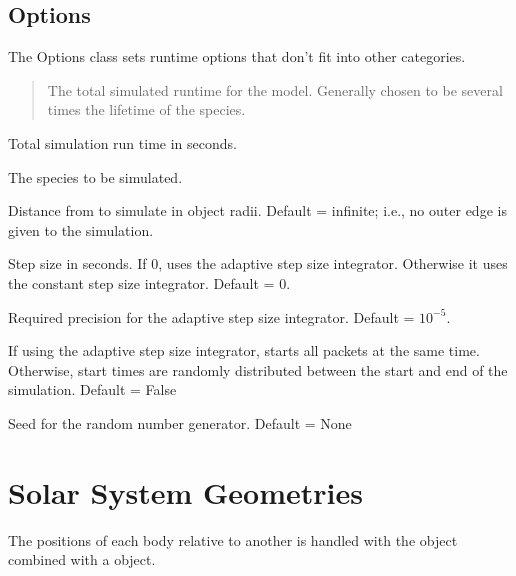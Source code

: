 \documentclass[letterpaper,10pt,english]{sphinxmanual}
\begin{document}
\subsection{Options}
\label{\detokenize{nexoclom2/inputfiles:options}}\label{\detokenize{nexoclom2/inputfiles:id8}}
\sphinxAtStartPar
The Options class sets runtime options that don’t fit into other categories.
\begin{quote}

\sphinxAtStartPar
The total simulated runtime for the model. Generally chosen to be several
times the lifetime of the species.
\end{quote}
\begin{description}
\sphinxAtStartPar
Total simulation run time in seconds.

\sphinxAtStartPar
The species to be simulated.

\sphinxAtStartPar
Distance from  to simulate in object radii. Default =
infinite; i.e., no outer edge is given to the simulation.

\sphinxAtStartPar
Step size in seconds. If 0, uses the adaptive step size integrator. Otherwise
it uses the constant step size integrator. Default = 0.

\sphinxAtStartPar
Required precision for the adaptive step size integrator.
Default = \(10^{-5}\).

\sphinxAtStartPar
If using the adaptive step size integrator, 
starts all packets at the same time. Otherwise, start times are
randomly distributed between the start and end of the simulation.
Default = False

\sphinxAtStartPar
Seed for the random number generator. Default = None

\end{description}

\sphinxstepscope


\section{Solar System Geometries}
\label{\detokenize{nexoclom2/planet_distance:solar-system-geometries}}\label{\detokenize{nexoclom2/planet_distance:planetdistance}}\label{\detokenize{nexoclom2/planet_distance::doc}}
\sphinxAtStartPar
The positions of each body relative to another is handled with the 
object combined with a  object.
\end{document}
